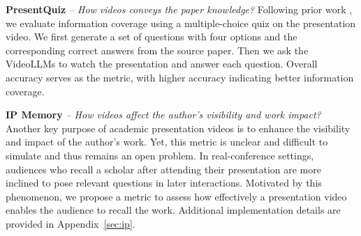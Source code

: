 \vspace{-0.2\baselineskip}
\noindent\textbf{PresentQuiz} \textit{-- How videos conveys the paper knowledge?} Following prior work \cite{pang2025paper2poster}, we evaluate information coverage using a multiple-choice quiz on the presentation video. We first generate a set of questions with four options and the corresponding correct answers from the source paper. Then we ask the VideoLLMs to watch the presentation and answer each question. Overall accuracy serves as the metric, with higher accuracy indicating better information coverage. 


\vspace{-0.3\baselineskip}
\noindent\textbf{IP Memory} \textit{-- How videos affect the author's visibility and work impact?} Another key purpose of academic presentation videos is to enhance the visibility and impact of the author’s work. Yet, this metric is unclear and difficult to simulate and thus remains an open problem. In real-conference settings, audiences who recall a scholar after attending their presentation are more inclined to pose relevant questions in later interactions. Motivated by this phenomenon, we propose a metric to assess how effectively a presentation video enables the audience to recall the work. Additional implementation details are provided in Appendix~\ref{sec:ip}.

